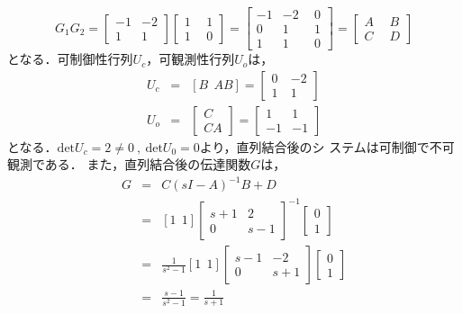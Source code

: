 \documentclass[a4paper,12pt]{jarticle}
\begin{document}
\begin{equation}
 G_1G_2=\left[
  \begin{array}{c|c}
  -1 & -2  \\ \hline
   1 & 1    
  \end{array}
  \right] \left[
  \begin{array}{c|c}
  1 ~&~ 1  \\ \hline
  1 ~&~ 0    
  \end{array}
  \right]=\left[
  \begin{array}{cc|c}
  -1 & -2 ~&~ 0  \\ 
  0  &  1 ~&~ 1  \\\hline
  1  &  1 ~&~ 0
  \end{array}
  \right]=\left[
  \begin{array}{c|c}
  A ~&~ B  \\ \hline
  C ~&~ D    
  \end{array}
  \right]
  \end{equation}
%
となる．可制御性行列$U_c$，可観測性行列$U_o$は，
%
\begin{eqnarray}
 U_c&=&[B~~AB]=\left[
  \begin{array}{cc}
  0 ~& -2  \\ 
  1 ~& 1    
  \end{array}
\right] \\
 U_o&=&\left[
  \begin{array}{c}
  C \\ 
  CA     
  \end{array}
\right]=\left[
  \begin{array}{cc}
  1  & 1  \\ 
  -1 & -1    
  \end{array}
\right] 
\end{eqnarray}
%
となる．$\mathrm{det}U_c=2\neq0~,~\mathrm{det}U_0=0$より，直列結合後のシ
ステムは可制御で不可観測である．
%
また，直列結合後の伝達関数$G$は，
%
\begin{eqnarray}
 G&=&C(sI-A)^{-1}B+D \nonumber\\
 &=&[1~~1]\left[
  \begin{array}{cc}
  s+1 &  2  \\ 
   0  & s-1    
  \end{array}
\right]^{-1}\left[
  \begin{array}{c}
   0  \\ 
   1      
  \end{array}
\right] \nonumber\\
  &=&\frac{1}{s^2-1}[1~~1]\left[
  \begin{array}{cc}
  s-1 &  -2  \\ 
   0  & s+1    
  \end{array}
\right]\left[
  \begin{array}{c}
   0  \\ 
   1      
  \end{array}
\right] \nonumber\\
&=&\frac{s-1}{s^2-1}=\frac{1}{s+1}
\end{eqnarray}
\end{document}
